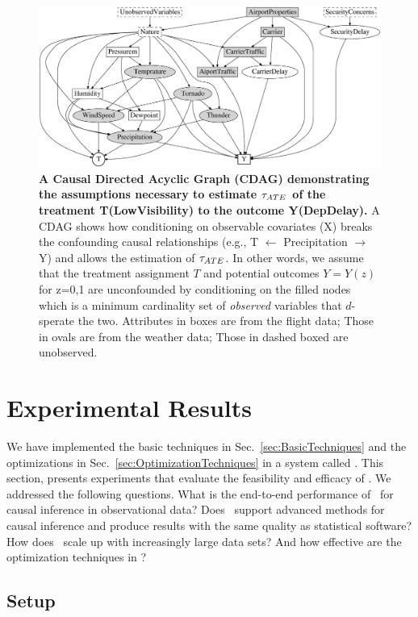 

\begin{figure}
  \centering
    \includegraphics[width=.7\linewidth]{Figures/dag.eps}
\caption{ {\bf \small A Causal Directed Acyclic Graph (CDAG)  demonstrating
    the assumptions necessary to estimate ${\tau_{ATE}}$ of the treatment
    T(LowVisibility) to the outcome Y(DepDelay).}  A CDAG shows how conditioning on observable covariates (X)
breaks the confounding causal relationships (e.g., T  $\leftarrow$ Precipitation
$\rightarrow$ Y) and allows the estimation of ${\tau_{ATE}}$. In other words, we assume that the treatment assignment $T$
and potential outcomes $Y=Y(z)$ for z=0,1 are unconfounded
by conditioning on the filled nodes which is a minimum cardinality set of {\em observed} variables that $d$-sperate the two. Attributes in boxes are from the flight data; Those in ovals are from the weather data; Those in dashed boxed are unobserved.}
\label{fig:dag}
\end{figure}

\vspace{-0.6cm}
\section{Experimental Results}
\label{sec:exp}

We have implemented the basic techniques in
Sec.~\ref{sec:BasicTechniques} and the optimizations in
Sec.~\ref{sec:OptimizationTechniques} in a system called \GSQL.  This
section, presents experiments that evaluate the feasibility and
efficacy of \GSQL.  We addressed the following questions.  What is the
end-to-end performance of \GSQL \ for causal inference in
observational data?  Does \GSQL \ support advanced methods for causal
inference and produce results with the same quality as statistical
software? How does \GSQL\ scale up with increasingly large data sets?
And how effective are the optimization techniques in \GSQL?

\vspace{-.2cm}

\subsection{Setup}
\label{sec:setup}

